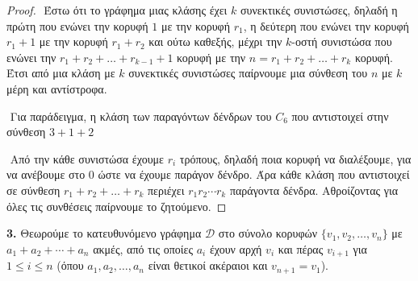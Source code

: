 \documentclass[oneside,a4paper]{article}
\begin{document}
\begin{proof}
	$ $\newline
	Έστω ότι το γράφημα μιας κλάσης έχει $k$ συνεκτικές συνιστώσες, δηλαδή η πρώτη που ενώνει την κορυφή $1$ με την κορυφή $r_1$, η δεύτερη που ενώνει την κορυφή $r_1 + 1$ με την κορυφή $r_1 + r_2$ και ούτω καθεξής, μέχρι την $k$-οστή συνιστώσα που ενώνει την $r_1 + r_2 + \ldots + r_{k-1} + 1$ κορυφή με την $n = r_1 + r_2 + \ldots + r_k$ κορυφή. Έτσι από μια κλάση με $k$ συνεκτικές συνιστώσες παίρνουμε μια σύνθεση του $n$ με $k$ μέρη και αντίστροφα.
	
	$ $\newline
	Για παράδειγμα, η κλάση των παραγόντων δένδρων του $C_6$ που αντιστοιχεί στην σύνθεση $3+1+2$
	\begin{figure}[ht]
		\centering
	\end{figure}

	$ $\newline
	Από την κάθε συνιστώσα έχουμε $r_i$ τρόπους, δηλαδή ποια κορυφή να διαλέξουμε, για να ανέβουμε στο $0$ ώστε να έχουμε παράγον δένδρο. Άρα κάθε κλάση που αντιστοιχεί σε σύνθεση $r_1 + r_2 + \ldots + r_k$ περιέχει $r_1 r_2 \cdots r_k$ παράγοντα δένδρα. Αθροίζοντας για όλες τις συνθέσεις παίρνουμε το ζητούμενο. 

\end{proof}
\pagebreak








\noindent \textbf{3.} Θεωρούμε το κατευθυνόμενο γράφημα $\mathcal{D}$ στο σύνολο κορυφών $\{v_1,v_2 ,\ldots, v_n\}$ με $a_1 + a_2 + \cdots + a_n$ ακμές, από τις οποίες $a_i$ έχουν αρχή $v_i$ και πέρας $v_{i+1}$ για $1\leq i \leq n$ (όπου $a_1, a_2, \ldots, a_n$ είναι θετικοί ακέραιοι και $v_{n+1} = v_1$).
\end{document}
